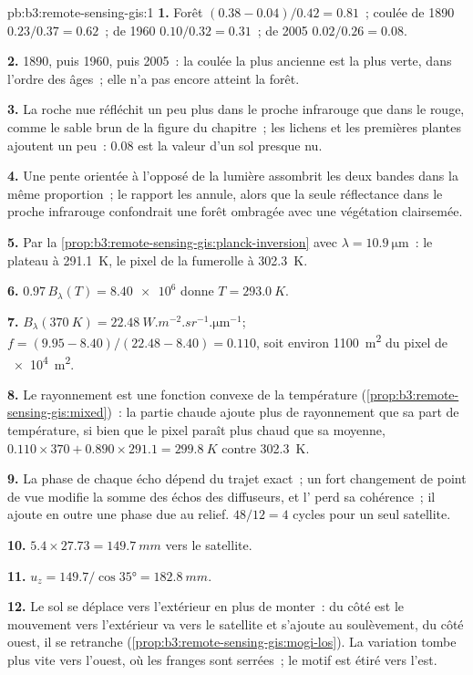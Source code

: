 \begin{solution}{pb:b3:remote-sensing-gis:1}
\textbf{1.} Forêt $(0.38 - 0.04)/0.42 = 0.81$~; coulée de 1890 $0.23/0.37 =
0.62$~; de 1960 $0.10/0.32 = 0.31$~; de 2005 $0.02/0.26 = 0.08$.

\textbf{2.} 1890, puis 1960, puis 2005~: la coulée la plus ancienne est la plus verte,
dans l'ordre des âges~; elle n'a pas encore atteint la forêt.

\textbf{3.} La roche nue réfléchit un peu plus dans le proche infrarouge que dans le
rouge, comme le sable brun de la figure du chapitre~; les lichens et les premières
plantes ajoutent un peu~: 0.08 est la valeur d'un sol presque nu.

\textbf{4.} Une pente orientée à l'opposé de la lumière assombrit les deux bandes dans la même
proportion~; le rapport les annule, alors que la seule réflectance dans le proche infrarouge
confondrait une forêt ombragée avec une végétation clairsemée.

\textbf{5.} Par la \cref{prop:b3:remote-sensing-gis:planck-inversion} avec
$\lambda = \qty{10.9}{\micro\metre}$~: le plateau à \qty{291.1}{K}, le
pixel de la fumerolle à \qty{302.3}{K}.

\textbf{6.} $0.97\,B_\lambda(T) = \num{8.40e6}$ donne $T = \qty{293.0}{K}$.

\textbf{7.} $B_\lambda(\qty{370}{K}) =
\qty{22.48}{W.m^{-2}.sr^{-1}.\micro\metre^{-1}}$; $f = (9.95 - 8.40)/(22.48
- 8.40) = 0.110$, soit environ \qty{1100}{m^2} du pixel de \qty{e4}{m^2}.

\textbf{8.} Le rayonnement est une fonction convexe de la température
(\cref{prop:b3:remote-sensing-gis:mixed})~: la partie chaude ajoute plus de rayonnement
que sa part de température, si bien que le pixel paraît plus chaud que sa moyenne,
$0.110\times370 + 0.890\times291.1 = \qty{299.8}{K}$ contre
\qty{302.3}{K}.

\textbf{9.} La phase de chaque écho dépend du trajet exact~; un fort
changement de point de vue modifie la somme des échos des diffuseurs, et
l' perd sa cohérence~; il ajoute en outre une phase due au relief.
$48/12 = 4$ cycles pour un seul satellite.

\textbf{10.} $5.4\times27.73 = \qty{149.7}{mm}$ vers le satellite.

\textbf{11.} $u_z = 149.7/\cos\ang{35} = \qty{182.8}{mm}$.

\textbf{12.} Le sol se déplace vers l'extérieur en plus de monter~: du côté est
le mouvement vers l'extérieur va vers le satellite et s'ajoute au soulèvement, du côté ouest,
il se retranche (\cref{prop:b3:remote-sensing-gis:mogi-los}). La variation
tombe plus vite vers l'ouest, où les franges sont serrées~; le motif est étiré
vers l'est.


\end{solution}
